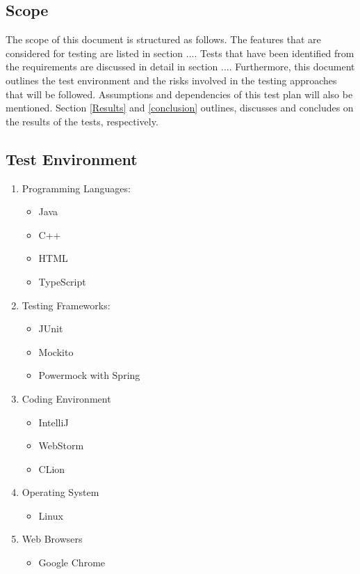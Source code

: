 \documentclass[11pt,a4paper]{article}
\begin{document}
\subsection{Scope}
The scope of this document is structured as follows. The features that are considered for
testing are listed in section .... Tests that have been identified from the requirements are
discussed in detail in section .... Furthermore, this document outlines the test environment
and the risks involved in the testing approaches that will be followed. Assumptions and
dependencies of this test plan will also be mentioned. Section \ref{Results} and \ref{conclusion} outlines,
discusses and concludes on the results of the tests, respectively.

\subsection{Test Environment}
\begin{enumerate}
	\item Programming Languages:
		\begin{itemize}
			\item Java
			\item C++
			\item HTML
			\item TypeScript
		\end{itemize}
	\item Testing Frameworks:
		\begin{itemize}
			\item JUnit
			\item Mockito
			\item Powermock with Spring
		\end{itemize}
	\item Coding Environment
		\begin{itemize}
			\item IntelliJ
			\item WebStorm
			\item CLion
		\end{itemize}
	\item Operating System
		\begin{itemize}
			\item Linux
		\end{itemize}
	\item Web Browsers
		\begin{itemize}
			\item Google Chrome
		\end{itemize}
\end{enumerate}
\end{document}
